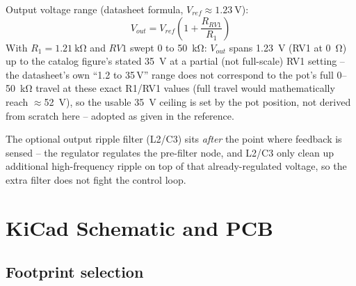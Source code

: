 \documentclass[11pt,letterpaper]{article}
\begin{document}
Output voltage range (datasheet formula, $V_{ref}\approx\SI{1.23}{\volt}$):
\begin{equation}
V_{out} = V_{ref}\left(1+\frac{R_{RV1}}{R_1}\right)
\end{equation}
With $R_1=\SI{1.21}{\kilo\ohm}$ and $RV1$ swept 0 to \SI{50}{\kilo\ohm}: $V_{out}$ spans
\SI{1.23}{\volt} (RV1 at \SI{0}{\ohm}) up to the catalog figure's stated \SI{35}{\volt} at a
partial (not full-scale) RV1 setting -- the datasheet's own ``1.2 to 35\,V'' range does not correspond to
the pot's full \SI{0}{}--\SI{50}{\kilo\ohm} travel at these exact R1/RV1 values (full travel would
mathematically reach $\approx$\SI{52}{\volt}), so the usable \SI{35}{\volt} ceiling is set by the
pot position, not derived from scratch here -- adopted as given in the reference.

The optional output ripple filter (L2/C3) sits \emph{after} the point where feedback is sensed -- the
regulator regulates the pre-filter node, and L2/C3 only clean up additional high-frequency ripple on top
of that already-regulated voltage, so the extra filter does not fight the control loop.

\section{KiCad Schematic and PCB}
\label{sec:pcb}

\subsection{Footprint selection}

\begin{center}
\end{center}
\end{document}
